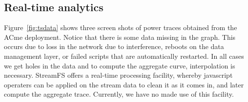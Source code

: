



\subsection{Real-time analytics}

Figure~\ref{fig:tsdata} shows three screen shots of power traces obtained from the ACme deployment.  Notice that there is
some data missing in the graph.  This occurs due to loss in the network due to interference, reboots on the data management layer,
or failed scripts that are automatically restarted.  In all cases we get holes in the data and to compute the aggregate
curve, interpolation is necessary.  StreamFS offers a real-time processing facility, whereby javascript operaters can be applied
on the stream data to clean it as it comes in, and later compute the aggregate trace.  Currently, we have no made use of this facility.

